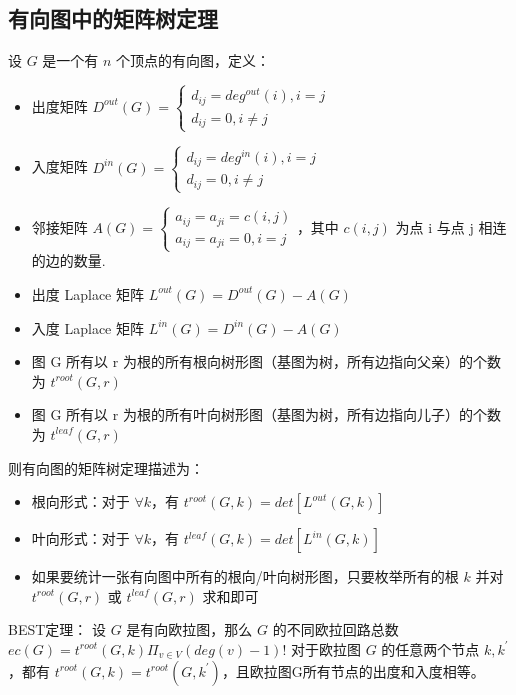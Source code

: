 \subsection{有向图中的矩阵树定理}
\par 设 $G$ 是一个有 $n$ 个顶点的有向图，定义：
\begin{itemize}
\item 出度矩阵 $D^{out}\left(G\right)=\begin{cases}d_{ij}=deg^{out}(i), i=j \\ d_{ij} = 0, i \neq j\end{cases}$ 
\item 入度矩阵 $D^{in}(G) = \begin{cases}d_{ij}=deg^{in}(i), i=j \\ d_{ij} = 0, i \neq j\end{cases}$
\item 邻接矩阵 $A(G) = \begin{cases}a_{ij}=a_{ji}=c(i,j) \\ a_{ij}=a_{ji}=0, i = j \end{cases}$，其中 $c(i, j)$ 为点 i 与点 j 相连的边的数量.
\item 出度 Laplace 矩阵 $L^{out}(G)=D^{out}(G)-A(G)$
\item 入度 Laplace 矩阵 $L^{in}(G)=D^{in}(G)-A(G)$
\item 图 G 所有以 r 为根的所有根向树形图（基图为树，所有边指向父亲）的个数为 $t^{root}\left(G,r\right)$
\item 图 G 所有以 r 为根的所有叶向树形图（基图为树，所有边指向儿子）的个数为 $t^{leaf}\left(G,r\right)$
\end{itemize}
\par 则有向图的矩阵树定理描述为：
\begin{itemize}
\item 根向形式：对于 $\forall k$，有 $t^{root}\left(G,k\right)=det\left[L^{out}\left(G,k\right)\right]$
\item 叶向形式：对于 $\forall k$，有 $t^{leaf}\left(G,k\right)=det\left[L^{in}\left(G,k\right)\right]$
\item 如果要统计一张有向图中所有的根向/叶向树形图，只要枚举所有的根 $k$ 并对$t^{root}\left(G,r\right)$ 或 $t^{leaf}(G,r)$ 求和即可
\end{itemize}
\par BEST定理：    设 $G$ 是有向欧拉图，那么 $G$ 的不同欧拉回路总数 $ec\left(G\right)=t^{root}\left(G,k\right)\Pi_{v\in V}\left(deg\left(v\right)-1\right)!$
对于欧拉图 $G$ 的任意两个节点 $k,k^\prime$，都有 $t^{root}\left(G,k\right)=t^{root}\left(G,k^\prime\right)$，且欧拉图G所有节点的出度和入度相等。


